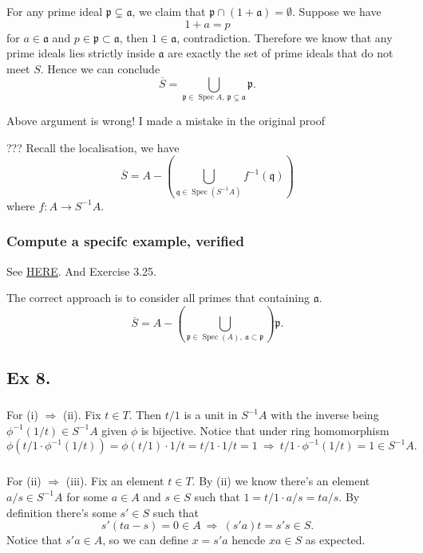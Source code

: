 For any prime ideal $\mathfrak p\subsetneq \mathfrak a$, we claim that $\mathfrak p\cap (1+\mathfrak a)=\emptyset$. Suppose we have 
$$1+a=p$$ for $a\in\mathfrak a$ and $p\in\mathfrak p\subset\mathfrak a$, then $1\in \mathfrak a$, contradiction. 
Therefore we know that any prime ideals lies strictly inside $\mathfrak a$ are exactly the set of prime ideals that do not meet $S$. Hence we can conclude 
$$\overline{S}=\bigcup_{\mathfrak p\in\operatorname{Spec}A,~\mathfrak p\subsetneq \mathfrak a}\mathfrak p.$$

Above argument is wrong! I made a mistake in the original proof 

??? Recall the localisation, we have 
$$\overline{S}=A-\left(\bigcup_{\mathfrak q\in\operatorname{Spec}(S^{-1}A)}f^{-1}(\mathfrak q)\right)$$ where $f:A\to S^{-1}A$.

\subsubsection{Compute a specifc example, verified}

See \href{https://math.stackexchange.com/questions/1635191/saturation-of-a-multiplicatively-closed-subset}{HERE}. And \cite{altman} Exercise 3.25. 

The correct approach is to consider all primes that containing $\mathfrak a$.
$$\overline{S}=A-\left(\bigcup_{\mathfrak p\in\operatorname{Spec}(A),~ \mathfrak a\subset\mathfrak p}\right)\mathfrak p.$$

\subsection{Ex 8.}

\subsubsection{}

For (i) $\Rightarrow$ (ii). Fix $t\in T$. Then $t/1$ is a unit in $S^{-1}A$ with the inverse being $\phi^{-1}(1/t)\in S^{-1}A$ given $\phi$ is bijective. 
Notice that under ring homomorphism 
\[\phi(t/1\cdot\phi^{-1}(1/t))=\phi(t/1)\cdot 1/t=t/1\cdot 1/t=1 ~\Rightarrow~ t/1\cdot\phi^{-1}(1/t)=1\in S^{-1}A.\]

\subsubsection{}

For (ii) $\Rightarrow$ (iii). Fix an element $t\in T$. By (ii) we know there's an element $a/s\in S^{-1}A$ for some $a\in A$ and $s\in S$ such that $1=t/1\cdot a/s=ta/s$. By definition there's some $s'\in S$ such that \[s'(ta-s)=0\in A ~\Rightarrow~ (s'a)t=s's\in S.\] Notice that $s'a\in A$, so we can define $x=s'a$ hencde $xa\in S$ as expected. 

